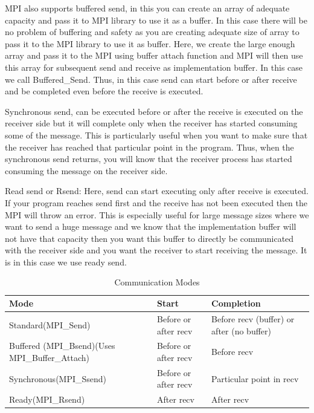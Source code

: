 \documentclass[12pt]{article}
\begin{document}
MPI also supports buffered send, in this you can create an array of adequate capacity and pass it to MPI library to use it as a buffer. In this case there will be no problem of buffering and safety as you are creating adequate size of array to pass it to the MPI library to use it as buffer. Here, we create the large enough array and pass it to the MPI using buffer attach function and MPI will then use this array for subsequent send and receive as implementation buffer. In this case we call Buffered\_Send. Thus, in this case send can start before or after receive and be completed even before the receive is executed.

Synchronous send, can be executed before or after the receive is executed on the receiver side but it will complete only when the receiver has started consuming some of the message. This is particularly useful when you want to make sure that the receiver has reached that particular point in the program. Thus, when the synchronous send returns, you will know that the receiver process has started consuming the message on the receiver side.

Read send or Rsend: Here, send can start executing only after receive is executed. If your program reaches send first and the receive has not been executed then the MPI will throw an error. This is especially useful for large message sizes where we want to send a huge message and we know that the implementation buffer will not have that capacity then you want this buffer to directly be communicated with the receiver side and you want the receiver to start receiving the message. It is in this case we use ready send.


\begin{table}
    \centering
    \begin{tabular}
        {|p{}|p{}|p{}|}    
        \hline
        Mode & Start & Completion \\
        \hline
        Standard(MPI\_Send) & Before or after recv  & Before recv (buffer) or after (no buffer)\\
\hline
        Buffered (MPI\_Bsend)(Uses MPI\_Buffer\_Attach) & Before or after recv & Before recv\\
        \hline
         Synchronous(MPI\_Ssend)&Before or after recv  & Particular point in recv\\
         \hline
         Ready(MPI\_Rsend)& After recv & After recv\\
         \hline
    \end{tabular}
    \caption{Communication Modes}
    \label{tab:comm_modes}
\end{table}
\end{document}
